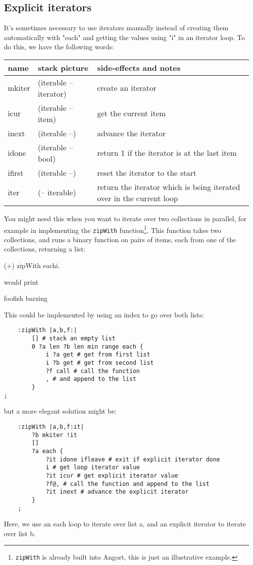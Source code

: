 \subsection{Explicit iterators}
It's sometimes necessary to use iterators manually instead of creating
them automatically with "each" and getting the values using "i" in an
iterator loop.
To do this, we have the following words:
\begin{center}
\begin{tabular}{|l|l|p{4in}|}\hline
\textbf{name} & \textbf{stack picture} & \textbf{side-effects and notes}\\ \hline
mkiter & (iterable -- iterator) & create an iterator\\
icur & (iterable -- item) & get the current item\\
inext & (iterable --) & advance the iterator\\
idone & (iterable -- bool) & return 1 if the iterator is at the last item\\
ifirst & (iterable --) & reset the iterator to the start\\
iter & (-- iterable) & return the iterator which is being iterated over in
the current loop\\
\hline
\end{tabular}
\end{center}


You might need this when you want to iterate over
two collections in parallel, for example in implementing the \texttt{zipWith}
function\footnote{\texttt{zipWith} is already built into Angort,
this is just an illustrative example.}. This function takes two collections, and runs a binary function on
pairs of items, each from one of the collections, returning a list:

\begin{v}
     (+) zipWith each{i.}
\end{v}
\noindent would print
\begin{v}
    foofish
    barzing
\end{v}
This could be implemented by using an index to go over both lists:

\begin{lstlisting}
    :zipWith |a,b,f:|
        [] # stack an empty list
        0 ?a len ?b len min range each {
            i ?a get # get from first list
            i ?b get # get from second list
            ?f call # call the function
            , # and append to the list
        }
;
\end{lstlisting}
but a more elegant solution might be:
\begin{lstlisting}
    :zipWith |a,b,f:it|
        ?b mkiter !it
        []
        ?a each {
            ?it idone ifleave # exit if explicit iterator done
            i # get loop iterator value
            ?it icur # get explicit iterator value
            ?f@, # call the function and append to the list
            ?it inext # advance the explicit iterator
        }
    ;
\end{lstlisting}
Here, we use an each loop to iterate over list a, and an explicit
iterator to iterate over list b.

